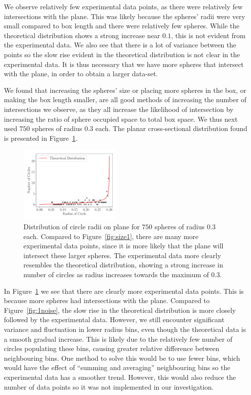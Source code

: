 \documentclass[journal]{IEEEtran}
\begin{document}
We observe relatively few experimental data points, as there were relatively few
intersections with the plane. This was likely because the spheres' radii were
very small compared to box length and there were relatively few spheres. While
the theoretical distribution shows a strong increase near $0.1$, this is not
evident from the experimental data. We also see that there is a lot of variance
between the points so the slow rise evident in the theoretical distribution is
not clear in the experimental data. It is thus necessary that we have more
spheres that intersect with the plane, in order to obtain a larger data-set.

We found that increasing the spheres' size or placing more spheres in the box,
or making the box length smaller, are all good methods of increasing the number
of intersections we observe, as they all increase the likelihood of intersection
by increasing the ratio of sphere occupied space to total box space. We thus
next used $750$ spheres of radius $0.3$ each. The planar cross-sectional
distribution found is presented in Figure~\ref{fig:size3}.

\begin{figure}%
\begin{center}
\includegraphics[width=0.45\textwidth]{images/750_03.pdf}
\caption{Distribution of circle radii on plane for $750$ spheres of radius $0.3$
  each. Compared to Figure~\ref{fig:size1}, there are many more experimental data
  points, since it is more likely that the plane will intersect these larger
  spheres. The experimental data more clearly resembles the theoretical
  distribution, showing a strong increase in number of circles as radius
  increases towards the maximum of 0.3.}\label{fig:size3}
\end{center}
\end{figure}

In Figure~\ref{fig:size3} we see that there are clearly more experimental data
points. This is because more spheres had intersections with the plane. Compared
to Figure~\ref{fig:1noise}, the slow rise in the theoretical distribution is
more closely followed by the experimental data. However, we still encounter
significant variance and fluctuation in lower radius bins, even though the
theoretical data is a smooth gradual increase. This is likely due to the
relatively few number of circles populating these bins, causing greater relative
difference between neighbouring bins. One method to solve this would be to use
fewer bins, which would have the effect of ``summing and averaging''
neighbouring bins so the experimental data has a smoother trend. However, this
would also reduce the number of data points so it was not implemented in our
investigation.
\end{document}
